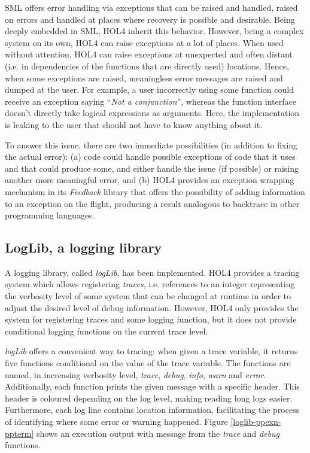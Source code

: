 \documentclass{kththesis}
\begin{document}
{\gls{SML} offers error handling via exceptions that can be raised and handled, raised on errors and handled at places where recovery is possible and desirable. Being deeply embedded in SML, HOL4 inherit this behavior. However, being a complex system on its own, HOL4 can raise exceptions at a lot of places. When used without attention, HOL4 can raise exceptions at unexpected and often distant (i.e. in dependencies of the functions that are directly used) locations. Hence, when some exceptions are raised, meaningless error messages are raised and dumped at the user. For example, a user incorrectly using some function could receive an exception saying ``\textit{Not a conjunction}'', whereas the function interface doesn't directly take logical expressions as arguments. Here, the implementation is leaking to the user that should not have to know anything about it.

To answer this issue, there are two immediate possibilities (in addition to fixing the actual error): (a) code could handle possible exceptions of code that it uses and that could produce some, and either handle the issue (if possible) or raising another more meaningful error, and (b) HOL4 provides an exception wrapping mechanism in its \textit{Feedback} library that offers the possibility of adding information to an exception on the flight, producing a result analogous to backtrace in other programming languages.

\subsection{LogLib, a logging library} \label{loglib}

A logging library, called \textit{logLib}, has been implemented. HOL4 provides a tracing system which allows registering \textit{traces}, i.e. references to an integer representing the verbosity level of some system that can be changed at runtime in order to adjust the desired level of debug information. However, HOL4 only provides the system for registering traces and some logging function, but it does not provide conditional logging functions on the current trace level.

\textit{logLib} offers a convenient way to tracing: when given a trace variable, it returns five functions conditional on the value of the trace variable. The functions are named, in increasing verbosity level, \textit{trace}, \textit{debug}, \textit{info}, \textit{warn} and \textit{error}. Additionally, each function prints the given message with a specific header. This header is coloured depending on the log level, making reading long logs easier. Furthermore, each log line contains location information, facilitating the process of identifying where some error or warning happened. Figure \ref{loglib-ppexn-ppterm} shows an execution output with message from the \textit{trace} and \textit{debug} functions.

}
\end{document}
